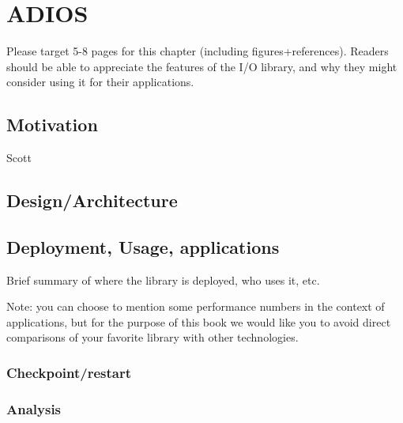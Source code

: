 
\chapter{ADIOS}
\label{part3-ch5-adios}
{\color {red}Please target 5-8 pages for this chapter (including figures+references). Readers should be able to appreciate the features of the I/O library, and why they might consider using it for their applications.}


\section{Motivation}
{\color {red}Scott}




\section{Design/Architecture}




\section{Deployment, Usage, applications}
{\color {red}Brief summary of where the library is deployed, who uses it, etc.

Note: you can choose to mention some performance numbers in the context of applications, but for the purpose of this book we would like you to avoid direct comparisons of your favorite library with other technologies.  }


\subsection{Checkpoint/restart}



\subsection{Analysis}

\vspace{10pt}



